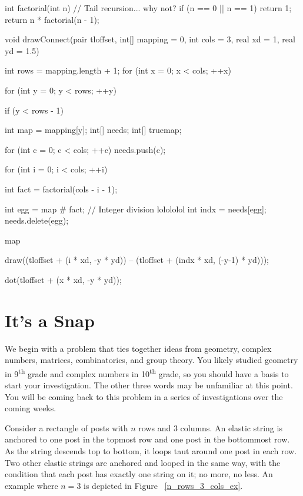 \documentclass[../build/gatm.tex]{subfiles}
\begin{document}
\begin{asydef}

int factorial(int n) { // Tail recursion... why not?
	if (n == 0 || n == 1)
		return 1;
	return n * factorial(n - 1);
}

void drawConnect(pair tloffset, int[] mapping = {0}, int cols = 3, real xd = 1, real yd = 1.5) {
	int rows = mapping.length + 1;
	for (int x = 0; x < cols; ++x) {
		for (int y = 0; y < rows; ++y) {
			if (y < rows - 1) {
				int map = mapping[y];
				int[] needs;
				int[] truemap;
				
				for (int c = 0; c < cols; ++c) needs.push(c);
				
				for (int i = 0; i < cols; ++i) {
					int fact = factorial(cols - i - 1);
					
					int egg = map # fact; // Integer division lolololol
					int indx = needs[egg];
					needs.delete(egg);
					
					map %
					
					draw((tloffset + (i * xd, -y * yd)) -- (tloffset + (indx * xd, (-y-1) * yd)));
				}
			}
			
			dot(tloffset + (x * xd, -y * yd));
		}
	}
}

\end{asydef}

\section{It's a Snap}

We begin with a problem that ties together ideas from geometry, complex numbers, matrices, combinatorics, and group theory. You likely studied geometry in 9\textsuperscript{th} grade and complex numbers in 10\textsuperscript{th} grade, so you should have a basis to start your investigation. The other three words may be unfamiliar at this point. You will be coming back to this problem in a series of investigations over the coming weeks.

Consider a rectangle of posts with $n$ rows and $3$ columns. An elastic string is anchored to one post in the topmost row and one post in the bottommost row. As the string descends top to bottom, it loops taut around one post in each row. Two other elastic strings are anchored and looped in the same way, with the condition that each post has exactly one string on it; no more, no less. An example where $n=3$ is depicted in Figure ~\ref{n_rows_3_cols_ex}.
\end{document}
